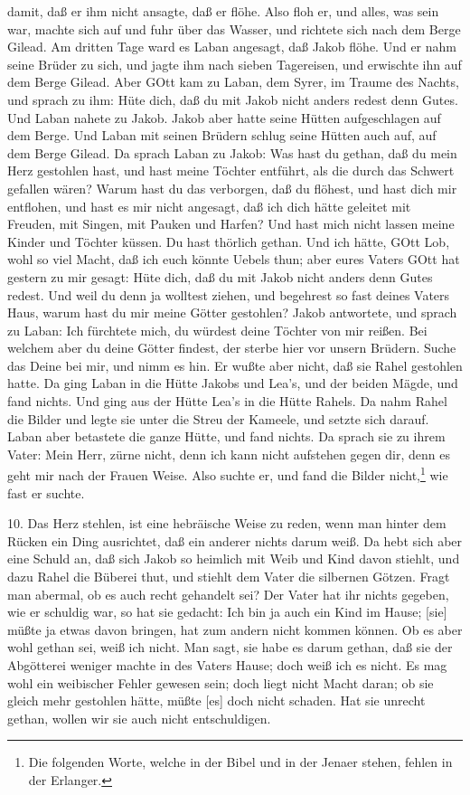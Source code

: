 \begin{schriftzitat}
damit, daß er ihm nicht ansagte, daß er flöhe. Also floh er, und alles, was sein war, machte sich auf und fuhr über das Wasser, und richtete sich nach dem Berge Gilead. Am dritten Tage ward es Laban angesagt, daß Jakob flöhe. Und er nahm seine Brüder zu sich, und jagte ihm nach sieben Tagereisen, und erwischte ihn auf dem Berge Gilead. Aber GOtt kam zu Laban, dem Syrer, im Traume des Nachts, und sprach zu ihm: Hüte dich, daß du mit Jakob nicht anders redest denn Gutes. Und Laban nahete zu Jakob. Jakob aber hatte seine Hütten aufgeschlagen auf dem Berge. Und Laban mit seinen Brüdern schlug seine Hütten auch auf, auf dem Berge Gilead. Da sprach Laban zu Jakob: Was hast du gethan, daß du mein Herz gestohlen hast, und hast meine Töchter entführt, als die durch das Schwert gefallen wären? Warum hast du das verborgen, daß du flöhest, und hast dich mir entflohen, und hast es mir nicht angesagt, daß ich dich hätte geleitet mit Freuden, mit Singen, mit Pauken und Harfen? Und hast mich nicht lassen meine Kinder und Töchter küssen. Du hast thörlich gethan. Und ich hätte, GOtt Lob, wohl so viel Macht, daß ich euch könnte Uebels thun; aber eures Vaters GOtt hat gestern zu mir gesagt: Hüte dich, daß du mit Jakob nicht anders denn Gutes redest. Und weil du denn ja wolltest ziehen, und begehrest so fast deines Vaters Haus, warum hast du mir meine Götter gestohlen? Jakob antwortete, und sprach zu Laban: Ich fürchtete mich, du würdest deine Töchter von mir reißen. Bei welchem aber du deine Götter findest, der sterbe hier vor unsern Brüdern. Suche das Deine bei mir, und nimm es hin. Er wußte aber nicht, daß sie Rahel gestohlen hatte. Da ging Laban in die Hütte Jakobs und Lea’s, und der beiden Mägde, und fand nichts. Und ging aus der Hütte Lea’s in die Hütte Rahels. Da nahm Rahel die Bilder und legte sie unter die Streu der Kameele, und setzte sich darauf. Laban aber betastete die ganze Hütte, und fand nichts. Da sprach sie zu ihrem Vater: Mein Herr, zürne nicht, denn ich kann nicht aufstehen gegen dir, denn es geht mir nach der Frauen Weise. Also suchte er, und fand die Bilder nicht,\footnote{Die folgenden Worte, welche in der Bibel und in der Jenaer stehen, fehlen in der Erlanger.} wie fast er suchte.
\end{schriftzitat}


10. Das Herz stehlen, ist eine hebräische Weise zu reden, wenn man hinter dem Rücken ein Ding ausrichtet, daß ein anderer nichts darum weiß. Da hebt sich aber eine Schuld an, daß sich Jakob so heimlich mit Weib und Kind davon stiehlt, und dazu Rahel die Büberei thut, und stiehlt dem Vater die silbernen Götzen. Fragt man abermal, ob es auch recht gehandelt sei? Der Vater hat ihr nichts gegeben, wie er schuldig war, so hat sie gedacht: Ich bin ja auch ein Kind im Hause; [sie] müßte ja etwas davon bringen, hat zum andern nicht kommen können. Ob es aber wohl gethan sei, weiß ich nicht. Man sagt, sie habe es darum gethan, daß sie der Abgötterei weniger machte in des Vaters Hause; doch weiß ich es nicht. Es mag wohl ein weibischer Fehler gewesen sein; doch liegt nicht Macht daran; ob sie gleich mehr gestohlen hätte, müßte [es] doch nicht schaden. Hat sie unrecht gethan, wollen wir sie auch nicht entschuldigen.

